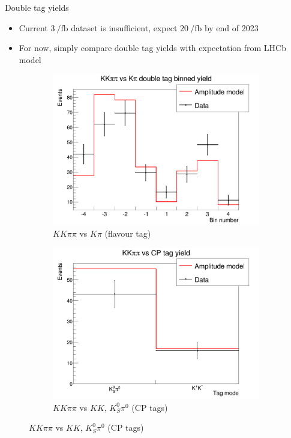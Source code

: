 \documentclass{beamer}
\begin{document}
\begin{frame}{Double tag yields}
  \begin{itemize}
    \setlength\itemsep{1.3em}
    \item{Current $\SI{3}{\per\femto\barn}$ dataset is insufficient, expect $\SI{20}{\per\femto\barn}$ by end of 2023}
    \item{For now, simply compare double tag yields with expectation from LHCb model}
  \end{itemize}
  \begin{figure}
    \centering
    \begin{subfigure}{0.5\textwidth}
      \centering
      \includegraphics[width = 1.0\textwidth]{../Report/Plots/DoubleTagYieldFlavour.png}
      \caption{$KK\pi\pi$ vs $K\pi$ (flavour tag)}
    \end{subfigure}%
    \begin{subfigure}{0.5\textwidth}
      \centering
      \includegraphics[width = 1.0\textwidth]{../Report/Plots/DoubleTagYieldInclusiveCP.png}
      \caption{$KK\pi\pi$ vs $KK$, $K_S^0\pi^0$ (CP tags)}
    \end{subfigure}
  \end{figure}
\end{frame}
\end{document}
